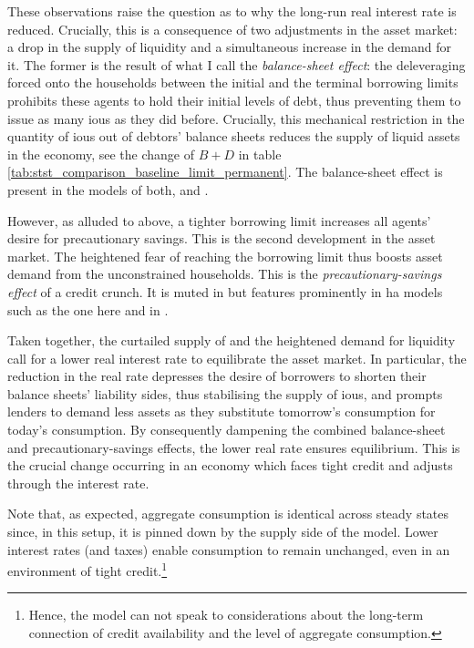 \documentclass[a4paper,12pt]{article} %
\numberwithin{equation}{section} %
\numberwithin{figure}{section}
\numberwithin{table}{section}
\begin{document}
These observations raise the question as to why the long-run real interest rate is reduced. Crucially, this is a consequence of two adjustments in the asset market: a drop in the supply of liquidity and a simultaneous increase in the demand for it. The former is the result of what I call the \textit{balance-sheet effect}: the deleveraging forced onto the households between the initial and the terminal borrowing limits prohibits these agents to hold their initial levels of debt, thus preventing them to issue as many \Gls{iou}s as they did before. Crucially, this mechanical restriction in the quantity of \Gls{iou}s out of debtors' balance sheets reduces the supply of liquid assets in the economy, see the change of $B + D$ in table \ref{tab:stst_comparison_baseline_limit_permanent}. The balance-sheet effect is present in the models of both, \textcite{egg2012} and \textcite{gl2017}. 

However, as alluded to above, a tighter borrowing limit increases all agents' desire for precautionary savings. This is the second development in the asset market. The heightened fear of reaching the borrowing limit thus boosts asset demand from the unconstrained households. This is the \textit{precautionary-savings effect} of a credit crunch. It is muted in \textcite{egg2012} but features prominently in \Gls{ha} models such as the one here and in \textcite{gl2017}. 

Taken together, the curtailed supply of and the heightened demand for liquidity call for a lower real interest rate to equilibrate the asset market. In particular, the reduction in the real rate depresses the desire of borrowers to shorten their balance sheets' liability sides, thus stabilising the supply of \Gls{iou}s, and prompts lenders to demand less assets as they substitute tomorrow's consumption for today's consumption. By consequently dampening the combined balance-sheet and precautionary-savings effects, the lower real rate ensures equilibrium. This is the crucial change occurring in an economy which faces tight credit and adjusts through the interest rate.

Note that, as expected, aggregate consumption is identical across steady states since, in this setup, it is pinned down by the supply side of the model. Lower interest rates (and taxes) enable consumption to remain unchanged, even in an environment of tight credit.\footnote{Hence, the model can not speak to considerations about the long-term connection of credit availability and the level of aggregate consumption.}
\end{document}
